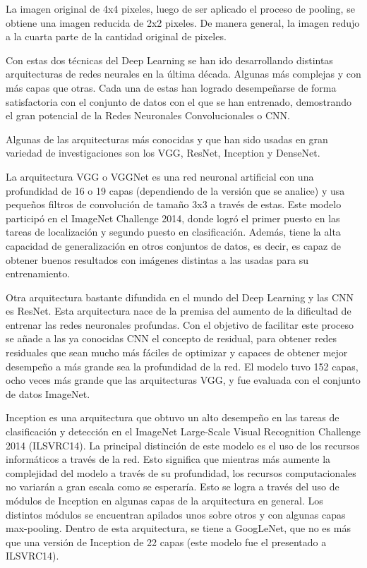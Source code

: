 La imagen original de 4x4 pixeles, luego de ser aplicado el proceso de pooling, se obtiene una imagen reducida de 2x2 pixeles. De manera general, la imagen redujo a la cuarta parte de la cantidad original de pixeles.

Con estas dos técnicas del Deep Learning se han ido desarrollando distintas arquitecturas de redes neurales en la última década. Algunas más complejas y con más capas que otras. Cada una de estas han logrado desempeñarse de forma satisfactoria con el conjunto de datos con el que se han entrenado, demostrando el gran potencial de la Redes Neuronales Convolucionales o CNN.

Algunas de las arquitecturas más conocidas y que han sido usadas en gran variedad de investigaciones son los VGG, ResNet, Inception y DenseNet.

La arquitectura VGG o VGGNet es una red neuronal artificial con una profundidad de 16 o 19 capas (dependiendo de la versión que se analice) y usa pequeños filtros de convolución de tamaño 3x3 a través de estas. Este modelo participó en el ImageNet Challenge 2014, donde logró el primer puesto en las tareas de localización y segundo puesto en clasificación. Además, tiene la alta capacidad de generalización en otros conjuntos de datos, es decir, es capaz de obtener buenos resultados con imágenes distintas a las usadas para su entrenamiento. \parencite{pr_simonyan2015vdcn}

Otra arquitectura bastante difundida en el mundo del Deep Learning y las CNN es ResNet. Esta arquitectura nace de la premisa del aumento de la dificultad de entrenar las redes neuronales profundas. Con el objetivo de facilitar este proceso se añade a las ya conocidas CNN el concepto de residual, para obtener redes residuales que sean mucho más fáciles de optimizar y capaces de obtener mejor desempeño a más grande sea la profundidad de la red. El modelo tuvo 152 capas, ocho veces más grande que las arquitecturas VGG, y fue evaluada con el conjunto de datos ImageNet. \parencite{pr_he2016deepres}

Inception es una arquitectura que obtuvo un alto desempeño en las tareas de clasificación y detección en el ImageNet Large-Scale Visual Recognition Challenge 2014 (ILSVRC14). La principal distinción de este modelo es el uso de los recursos informáticos a través de la red. Esto significa que mientras más aumente la complejidad del modelo a través de su profundidad, los recursos computacionales no variarán a gran escala como se esperaría. Esto se logra a través del uso de módulos de Inception en algunas capas de la arquitectura en general. Los distintos módulos se encuentran apilados unos sobre otros y con algunas capas max-pooling. Dentro de esta arquitectura, se tiene a GoogLeNet, que no es más que una versión de Inception de 22 capas (este modelo fue el presentado a ILSVRC14). \parencite{pr_szegedy2015goingdwc}

